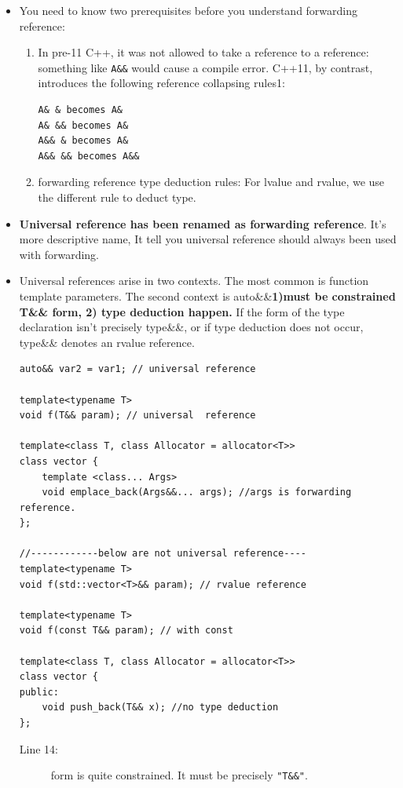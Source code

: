 \documentclass[a4paper,11pt,twoside]{book}
\begin{document}
\begin{itemize}
\item You need to know two prerequisites before you understand forwarding reference:

\begin{enumerate}
	\item In pre-11 C++, it was not allowed to take a reference to a reference: something like \texttt{A\&\&} would cause a compile error. C++11, by contrast, introduces the following reference collapsing rules1:
	
\begin{lstlisting}[numbers=none]
A& & becomes A&
A& && becomes A&
A&& & becomes A&
A&& && becomes A&&
\end{lstlisting}
	
	\item forwarding reference type deduction rules: For lvalue and rvalue, we use the different rule to deduct type.
\end{enumerate}

    \item \textbf{Universal reference has been renamed as forwarding reference}. It's more descriptive name, It tell you universal reference should always been used with forwarding.

    \item  Universal references arise in two contexts. The most common is function template parameters. The second context is auto\&\&\textbf{1)must be constrained T\&\& form, 2) type deduction happen.} If the form of the type declaration isn't precisely type\&\&, or if type deduction does not occur, type\&\& denotes an rvalue reference.
\begin{lstlisting}
auto&& var2 = var1; // universal reference

template<typename T>
void f(T&& param); // universal  reference

template<class T, class Allocator = allocator<T>>
class vector {
	template <class... Args>
	void emplace_back(Args&&... args); //args is forwarding reference. 
};

//------------below are not universal reference----
template<typename T>
void f(std::vector<T>&& param); // rvalue reference

template<typename T>
void f(const T&& param); // with const

template<class T, class Allocator = allocator<T>>
class vector { 
public:
	void push_back(T&& x); //no type deduction
};
\end{lstlisting}
\begin{description}
	\item[Line 14:] form is quite constrained. It must be precisely \texttt{"T\&\&"}.
\end{description}


\end{itemize}
\end{document}
